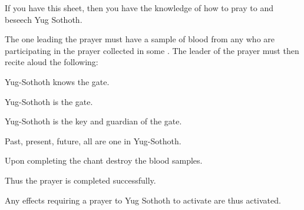 \documentclass[green]{guildcamp4}
\begin{document}
\name{\gPrayYog{}}

If you have this sheet, then you have the knowledge of how to pray to and beseech Yug Sothoth.

The one leading the prayer must have a sample of blood from any who are participating in the prayer collected in some  \iTestTube{}.
The leader of the prayer must then recite aloud the following:

Yug-Sothoth knows the gate. 
	
	Yug-Sothoth is the gate. 
	
	Yug-Sothoth is the key and guardian of the gate. 
	
	Past, present, future, all are one in Yug-Sothoth.

Upon completing the chant destroy the blood samples. 

Thus the prayer is completed successfully.

Any effects requiring a prayer to Yug Sothoth to activate are thus activated.
\end{document}
